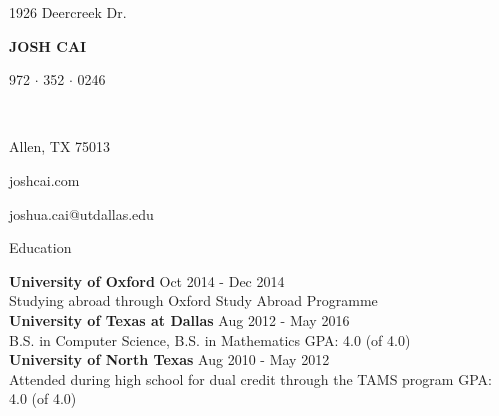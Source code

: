 \documentclass{resume} %
\newcommand\textbox[1]{%
  \parbox{.333\textwidth}{#1}%
}
\begin{document}
\noindent\textbox{1926 Deercreek Dr.\hfill}\textbox{\hfil {\MakeUppercase{\namesize\bf Josh Cai}}\hfil}\textbox{\hfill 972 $\cdot$ 352 $\cdot$ 0246}\\
\noindent\textbox{Allen, TX 75013\hfill}\textbox{\hfil joshcai.com\hfil}\textbox{\hfill joshua.cai@utdallas.edu}\medskip



\begin{rSection}{Education}

{\bf University of Oxford} \hfill Oct 2014 - Dec 2014 \\
Studying abroad through Oxford Study Abroad Programme\smallskip \\
{\bf University of Texas at Dallas} \hfill Aug 2012 - May 2016 \\
B.S. in Computer Science, B.S. in Mathematics \hfill GPA: 4.0 (of 4.0)\smallskip \\
{\bf University of North Texas} \hfill Aug 2010 - May 2012 \\
Attended during high school for dual credit through the TAMS program \hfill GPA: 4.0 (of 4.0)

\end{rSection}

\end{document}
